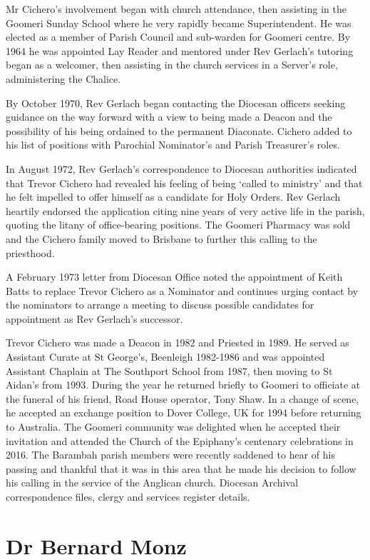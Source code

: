 Mr Cichero's involvement began with church attendance, then assisting in the Goomeri Sunday School where he very rapidly became Superintendent. He was elected as a member of Parish Council and sub-warden for Goomeri centre. By 1964 he was appointed Lay Reader and mentored under Rev Gerlach's tutoring began as a welcomer, then assisting in the church services in a Server's role, administering the Chalice.

By October 1970, Rev Gerlach began contacting the Diocesan officers seeking guidance on the way forward with a view to being made a Deacon and the possibility of his being ordained to the permanent Diaconate. Cichero added to his list of positions with Parochial Nominator's and Parish Treasurer's roles.

In August 1972, Rev Gerlach's correspondence to Diocesan authorities indicated that Trevor Cichero had revealed his feeling of being `called to ministry' and that he felt impelled to offer himself as a candidate for Holy Orders. Rev Gerlach heartily endorsed the application citing nine years of very active life in the parish, quoting the litany of office-bearing positions. The Goomeri Pharmacy was sold and the Cichero family moved to Brisbane to further this calling to the priesthood.

A February 1973 letter from Diocesan Office noted the appointment of Keith Batts to replace Trevor Cichero as a Nominator and continues urging contact by the nominators to arrange a meeting to discuss possible candidates for appointment as Rev Gerlach's successor.

Trevor Cichero was made a Deacon in 1982 and Priested in 1989. He served as Assistant Curate at St George's, Beenleigh 1982-1986 and was appointed Assistant Chaplain at The Southport School from 1987, then moving to St Aidan's from 1993. During the year he returned briefly to Goomeri to officiate at the funeral of his friend, Road House operator, Tony Shaw. In a change of scene, he accepted an exchange position to Dover College, UK for 1994 before returning to Australia. The Goomeri community was delighted when he accepted their invitation and attended the Church of the Epiphany's centenary celebrations in 2016. The Barambah parish members were recently saddened to hear of his passing and thankful that it was in this area that he made his decision to follow his calling in the service of the Anglican church. Diocesan Archival correspondence files, clergy and services register details.

\hypertarget{dr-bernard-monz}{%
\section{Dr Bernard Monz}\label{dr-bernard-monz}}

